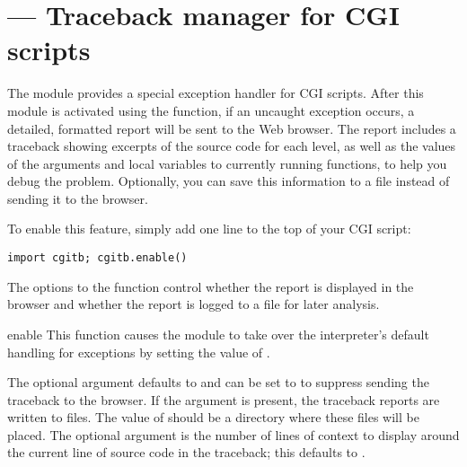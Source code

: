 \section{ ---
         Traceback manager for CGI scripts}



The  module provides a special exception handler for CGI
scripts.  After this module is activated using the 
function, if an uncaught exception occurs, a detailed, formatted
report will be sent to the Web browser.  The report includes a
traceback showing excerpts of the source code for each level, as well
as the values of the arguments and local variables to currently
running functions, to help you debug the problem.  Optionally, you can
save this information to a file instead of sending it to the browser.

To enable this feature, simply add one line to the top of your CGI script:

\begin{verbatim}
import cgitb; cgitb.enable()
\end{verbatim}

The options to the  function control whether the
report is displayed in the browser and whether the report is logged
to a file for later analysis.


\begin{funcdesc}{enable}{}
  This function causes the  module to take over the
  interpreter's default handling for exceptions by setting the
  value of .

  The optional argument  defaults to  and can be set
  to  to suppress sending the traceback to the browser.
  If the argument  is present, the traceback reports are
  written to files.  The value of  should be a directory
  where these files will be placed.
  The optional argument  is the number of lines of
  context to display around the current line of source code in the
  traceback; this defaults to .
\end{funcdesc}

